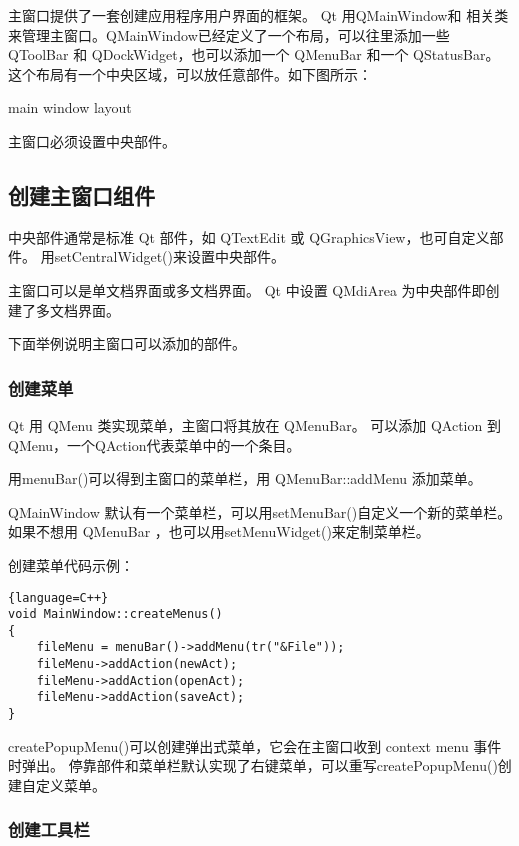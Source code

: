 主窗口提供了一套创建应用程序用户界面的框架。 Qt 用QMainWindow和 相关类 来管理主窗口。QMainWindow已经定义了一个布局，可以往里添加一些 QToolBar 和 QDockWidget，也可以添加一个 QMenuBar 和一个 QStatusBar。这个布局有一个中央区域，可以放任意部件。如下图所示：

main window layout

\begin{notice}
主窗口必须设置中央部件。
\end{notice}

\subsection{创建主窗口组件}

中央部件通常是标准 Qt 部件，如 QTextEdit 或 QGraphicsView，也可自定义部件。
用setCentralWidget()来设置中央部件。

主窗口可以是单文档界面或多文档界面。 
Qt 中设置 QMdiArea 为中央部件即创建了多文档界面。

下面举例说明主窗口可以添加的部件。

\subsubsection{创建菜单}

Qt 用 QMenu 类实现菜单，主窗口将其放在 QMenuBar。
可以添加 QAction 到QMenu，一个QAction代表菜单中的一个条目。

用menuBar()可以得到主窗口的菜单栏，用 QMenuBar::addMenu 添加菜单。

QMainWindow 默认有一个菜单栏，可以用setMenuBar()自定义一个新的菜单栏。
如果不想用 QMenuBar ，也可以用setMenuWidget()来定制菜单栏。

创建菜单代码示例：

\begin{lstlisting}{language=C++}
void MainWindow::createMenus()
{
    fileMenu = menuBar()->addMenu(tr("&File"));
    fileMenu->addAction(newAct);
    fileMenu->addAction(openAct);
    fileMenu->addAction(saveAct);
}
\end{lstlisting}

createPopupMenu()可以创建弹出式菜单，它会在主窗口收到 context menu 事件时弹出。
停靠部件和菜单栏默认实现了右键菜单，可以重写createPopupMenu()创建自定义菜单。

\subsubsection{创建工具栏}

